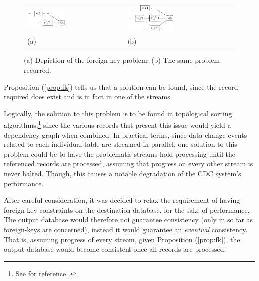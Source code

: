 \begin{figure}
	\centering
	\begin{tabular}{p{} p{}}
		\vspace{0pt} \includegraphics[width=0.4\textwidth]{figures/data/fk-stream} &
		\vspace{0pt} \includegraphics[width=0.44\textwidth]{figures/data/fk-stream-recurrence} \\
		(a) & (b)
	\end{tabular}
	\caption{(a) Depiction of the foreign-key problem. (b) The same problem recurred.}
	\label{fig:fk-stream}
\end{figure}

Proposition (\ref{prop:fk}) tells us that a solution can be found, since the record required does exist and is in fact in one of the streams.

Logically, the solution to this problem is to be found in topological sorting algorithms,\footnote{%
	See for reference \cite[\S 9.5.8]{montry}.
} since the various records that present this issue would yield a dependency graph when combined.
In practical terms, since data change events related to each individual table are streamed in parallel, one solution to this problem could be to have the problematic streams hold processing until the referenced records are processed, assuming that progress on every other stream is never halted.
Though, this causes a notable degradation of the CDC system's performance.

After careful consideration, it was decided to relax the requirement of having foreign key constraints on the destination database, for the sake of performance.
The output database would therefore not guarantee consistency (only in so far as foreign-keys are concerned), instead it would guarantee an \emph{eventual} consistency.
That is, assuming progress of every stream, given Proposition (\ref{prop:fk}), the output database would become consistent once all records are processed.
